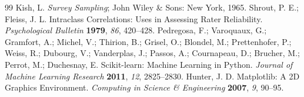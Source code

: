 \documentclass[11pt]{article}
\begin{document}
\begin{thebibliography}{99}
 Kish, L. \textit{Survey Sampling}; John Wiley \& Sons: New York, 1965.
 Shrout, P. E.; Fleiss, J. L. Intraclass Correlations: Uses in Assessing Rater Reliability. \textit{Psychological Bulletin} \textbf{1979}, \textit{86}, 420--428.
 Pedregosa, F.; Varoquaux, G.; Gramfort, A.; Michel, V.; Thirion, B.; Grisel, O.; Blondel, M.; Prettenhofer, P.; Weiss, R.; Dubourg, V.; Vanderplas, J.; Passos, A.; Cournapeau, D.; Brucher, M.; Perrot, M.; Duchesnay, E. Scikit-learn: Machine Learning in Python. \textit{Journal of Machine Learning Research} \textbf{2011}, \textit{12}, 2825--2830.
 Hunter, J. D. Matplotlib: A 2D Graphics Environment. \textit{Computing in Science \& Engineering} \textbf{2007}, \textit{9}, 90--95.
\end{thebibliography}
\end{document}
